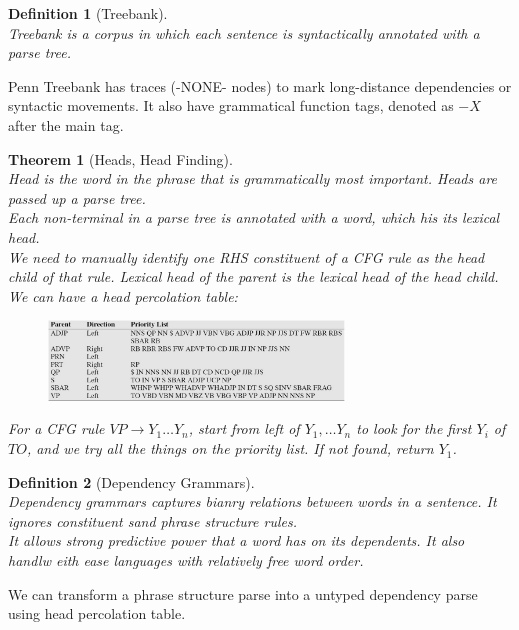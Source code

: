 \documentclass[12pt]{article}
\newtheorem{definition}{Definition}[section]
\newtheorem{theorem}{Theorem}[section]
\theoremstyle{definition}
\begin{document}
\begin{definition}[Treebank]
\hfill\\\normalfont Treebank is a corpus in which each sentence is syntactically annotated with a parse tree.
\end{definition}
Penn Treebank has traces (-NONE- nodes) to mark long-distance dependencies or syntactic movements.
It also have grammatical function tags, denoted as $-X$ after the main tag.
\begin{theorem}[Heads, Head Finding]
\hfill\\\normalfont Head is the word in the phrase that is grammatically most important. Heads are passed up a parse tree.\\
Each non-terminal in a parse tree is annotated with a word, which his its lexical head.\\
We need to manually identify one RHS constituent of a CFG rule as the head child of that rule. Lexical head of the parent is the lexical head of the head child.\\
We can have a head percolation table:
\begin{figure}[h]
\centering
\includegraphics[width=0.7\textwidth]{headtable.jpg}
\end{figure}
For a CFG rule $VP\to Y_1\ldots Y_n$, start from left of $Y_1,\ldots Y_n$ to look for the first $Y_i$ of $TO$, and we try all the things on the priority list. If not found, return $Y_1$.
\end{theorem}
\begin{definition}[Dependency Grammars]
\hfill\\\normalfont Dependency grammars captures bianry relations between words in a sentence. It ignores constituent sand phrase structure rules.\\
It allows strong predictive power that a word has on its dependents. It also handlw eith ease languages with relatively free word order.
\end{definition}
We can transform a phrase structure parse into a untyped dependency parse using head percolation table.
\clearpage
\end{document}
